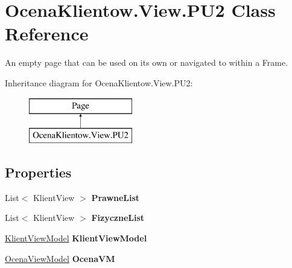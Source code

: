 \hypertarget{class_ocena_klientow_1_1_view_1_1_p_u2}{}\section{Ocena\+Klientow.\+View.\+P\+U2 Class Reference}
\label{class_ocena_klientow_1_1_view_1_1_p_u2}


An empty page that can be used on its own or navigated to within a Frame.  


Inheritance diagram for Ocena\+Klientow.\+View.\+P\+U2\+:\begin{figure}[H]
\begin{center}
\leavevmode
\includegraphics[height=2.000000cm]{class_ocena_klientow_1_1_view_1_1_p_u2}
\end{center}
\end{figure}
\subsection*{Properties}
\begin{DoxyCompactItemize}
\item 
\hypertarget{class_ocena_klientow_1_1_view_1_1_p_u2_a1ddfdb7cc8df3e6c7ba89a22159a0f03}{}\label{class_ocena_klientow_1_1_view_1_1_p_u2_a1ddfdb7cc8df3e6c7ba89a22159a0f03} 
List$<$ Klient\+View $>$ {\bfseries Prawne\+List}
\item 
\hypertarget{class_ocena_klientow_1_1_view_1_1_p_u2_a1f88f5b27909b31a3526226c2e054951}{}\label{class_ocena_klientow_1_1_view_1_1_p_u2_a1f88f5b27909b31a3526226c2e054951} 
List$<$ Klient\+View $>$ {\bfseries Fizyczne\+List}
\item 
\hypertarget{class_ocena_klientow_1_1_view_1_1_p_u2_aec5cfaa779bf2666f786e89ce9f64f8b}{}\label{class_ocena_klientow_1_1_view_1_1_p_u2_aec5cfaa779bf2666f786e89ce9f64f8b} 
\hyperlink{class_ocena_klientow_1_1_view_model_1_1_klient_view_model}{Klient\+View\+Model} {\bfseries Klient\+View\+Model}
\item 
\hypertarget{class_ocena_klientow_1_1_view_1_1_p_u2_a98ef5c77cddaa4efbbfa400305ac4996}{}\label{class_ocena_klientow_1_1_view_1_1_p_u2_a98ef5c77cddaa4efbbfa400305ac4996} 
\hyperlink{class_ocena_klientow_1_1_view_model_1_1_ocena_view_model}{Ocena\+View\+Model} {\bfseries Ocena\+VM}
\end{DoxyCompactItemize}


